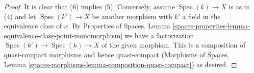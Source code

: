 \documentclass{stacks-project}
\theoremstyle{plain}
\theoremstyle{definition}
\theoremstyle{remark}
\numberwithin{equation}{subsection}
\def\Spec{\mathop{\mathrm{Spec}}}
\begin{document}
\begin{proof}
\medskip\noindent
It is clear that (6) implies (5). Conversely, assume $\Spec(k) \to X$ is
as in (4) and let $\Spec(k') \to X$ be another morphism with $k'$ a
field in the equivalence class of $x$. By
Properties of Spaces, Lemma
\ref{spaces-properties-lemma-equivalence-class-point-monomorphism}
we have a factorization $\Spec(k') \to \Spec(k) \to X$ of the
given morphism. This is a composition of quasi-compact
morphisms and hence quasi-compact (Morphisms of Spaces,
Lemma \ref{spaces-morphisms-lemma-composition-quasi-compact}) as desired.
\end{proof}
\end{document}
